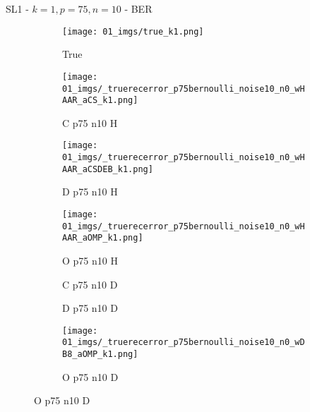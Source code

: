 \begin{frame}{SL1 - $k=1,p=75,n=10$ - BER}{}
\begin{figure}
\begin{subfigure}{0.13\textwidth}
\texttt{[image: 01\_imgs/true\_k1.png]}
\caption*{\tiny True}
\end{subfigure}
\begin{subfigure}{0.13\textwidth}
\texttt{[image: 01\_imgs/\_truerecerror\_p75bernoulli\_noise10\_n0\_wHAAR\_aCS\_k1.png]}
\caption*{\tiny C p75 n10 H}
\end{subfigure}
\begin{subfigure}{0.13\textwidth}
\texttt{[image: 01\_imgs/\_truerecerror\_p75bernoulli\_noise10\_n0\_wHAAR\_aCSDEB\_k1.png]}
\caption*{\tiny D p75 n10 H}
\end{subfigure}
\begin{subfigure}{0.13\textwidth}
\texttt{[image: 01\_imgs/\_truerecerror\_p75bernoulli\_noise10\_n0\_wHAAR\_aOMP\_k1.png]}
\caption*{\tiny O p75 n10 H}
\end{subfigure}
\begin{subfigure}{0.13\textwidth}
\caption*{\tiny C p75 n10 D}
\end{subfigure}
\begin{subfigure}{0.13\textwidth}
\caption*{\tiny D p75 n10 D}
\end{subfigure}
\begin{subfigure}{0.13\textwidth}
\texttt{[image: 01\_imgs/\_truerecerror\_p75bernoulli\_noise10\_n0\_wDB8\_aOMP\_k1.png]}
\caption*{\tiny O p75 n10 D}
\end{subfigure}
\end{figure}
\end{frame}

